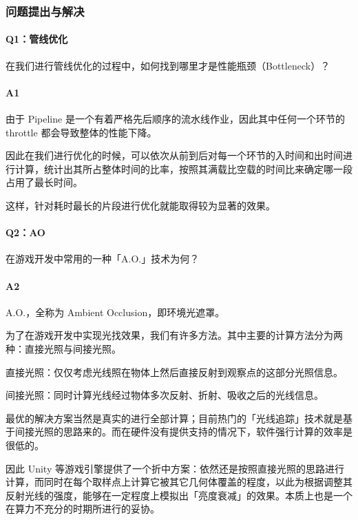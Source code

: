 \documentclass[
]{article}
\begin{document}
\hypertarget{header-n186}{%
\subsubsection{问题提出与解决}\label{header-n186}}

\hypertarget{header-n187}{%
\paragraph{Q1：管线优化}\label{header-n187}}

在我们进行管线优化的过程中，如何找到哪里才是性能瓶颈（Bottleneck）？

\hypertarget{header-n189}{%
\paragraph{A1}\label{header-n189}}

由于 Pipeline 是一个有着严格先后顺序的流水线作业，因此其中任何一个环节的
throttle 都会导致整体的性能下降。

因此在我们进行优化的时候，可以依次从前到后对每一个环节的入时间和出时间进行计算，统计出其所占整体时间的比率，按照其满载比空载的时间比来确定哪一段占用了最长时间。

这样，针对耗时最长的片段进行优化就能取得较为显著的效果。

\hypertarget{header-n193}{%
\paragraph{Q2：AO}\label{header-n193}}

在游戏开发中常用的一种「A.O.」技术为何？

\hypertarget{header-n195}{%
\paragraph{A2}\label{header-n195}}

A.O.，全称为 Ambient Occlusion，即环境光遮罩。

为了在游戏开发中实现光找效果，我们有许多方法。其中主要的计算方法分为两种：直接光照与间接光照。

直接光照：仅仅考虑光线照在物体上然后直接反射到观察点的这部分光照信息。

间接光照：同时计算光线经过物体多次反射、折射、吸收之后的光线信息。

最优的解决方案当然是真实的进行全部计算；目前热门的「光线追踪」技术就是基于间接光照的思路来的。而在硬件没有提供支持的情况下，软件强行计算的效率是很低的。

因此 Unity
等游戏引擎提供了一个折中方案：依然还是按照直接光照的思路进行计算，而同时在每个取样点上计算它被其它几何体覆盖的程度，以此为根据调整其反射光线的强度，能够在一定程度上模拟出「亮度衰减」的效果。本质上也是一个在算力不充分的时期所进行的妥协。
\end{document}
